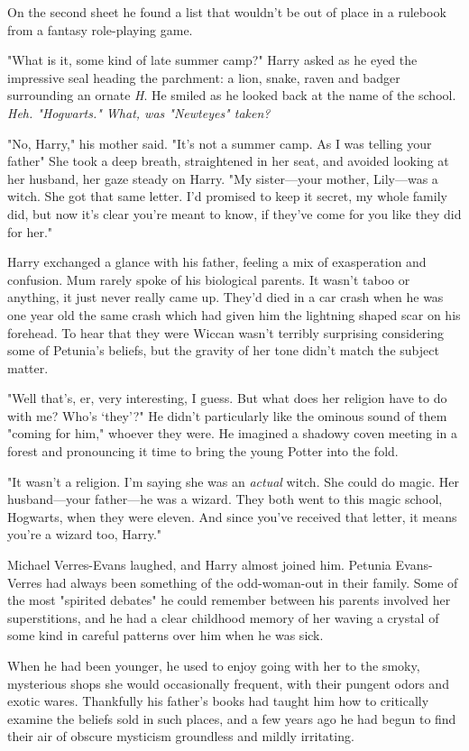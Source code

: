 On the second sheet he found a list that wouldn't be out
of place in a rulebook from a fantasy role-playing game.

"What is it, some kind of late summer camp?" Harry
asked as he eyed the impressive seal heading the
parchment: a lion, snake, raven and badger surrounding
an ornate \emph{H}. He smiled as he looked back at the name of
the school. \emph{Heh. "Hogwarts." What, was "Newteyes" taken?}

"No, Harry," his mother said. "It's not a summer camp. As
I was telling your father{\el}" She took a deep breath,
straightened in her seat, and avoided looking at her
husband, her gaze steady on Harry. "My sister—your mother,
Lily—was a witch. She got that same letter. I'd promised
to keep it secret, my whole family did, but now it's clear
you're meant to know, if they've come for you like they
did for her."

Harry exchanged a glance with his father, feeling a mix of
exasperation and confusion. Mum rarely spoke of his
biological parents. It wasn't taboo or anything, it just never
really came up. They'd died in a car crash when he was
one year old{\el} the same crash which had given him the
lightning shaped scar on his forehead. To hear that they
were Wiccan wasn't terribly surprising considering some of
Petunia's beliefs, but the gravity of her tone didn't match
the subject matter.

"Well that's, er, very interesting, I guess. But what does
her religion have to do with me? Who's `they'?" He didn't
particularly like the ominous sound of them "coming for
him," whoever they were. He imagined a shadowy coven
meeting in a forest and pronouncing it time to bring the
young Potter into the fold.

"It wasn't a religion. I'm saying she was an \emph{actual} witch.
She could do magic. Her husband—your father—he was a
wizard. They both went to this magic school, Hogwarts,
when they were eleven. And since you've received that letter, it
means you're a wizard too, Harry."

Michael Verres-Evans laughed, and Harry almost joined
him. Petunia Evans-Verres had always been something of
the odd-woman-out in their family. Some of the most
"spirited debates" he could remember between his parents
involved her superstitions, and he had a clear childhood
memory of her waving a crystal of some kind in careful
patterns over him when he was sick.

When he had been younger, he used to enjoy going with her to
the smoky, mysterious shops she would occasionally
frequent, with their pungent odors and exotic wares.
Thankfully his father's books had taught him how to
critically examine the beliefs sold in such places, and a few
years ago he had begun to find their air of obscure
mysticism groundless and mildly irritating.

